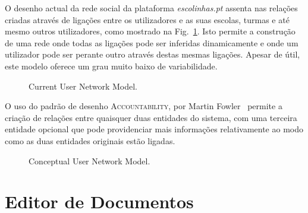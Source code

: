 \documentclass[9pt,a4paper]{extarticle}
\begin{document}
\begin{multicols}{2}
O desenho actual da rede social da plataforma \emph{escolinhas.pt} assenta nas relações criadas através de ligações entre os utilizadores e as suas escolas, turmas e até mesmo outros utilizadores, como mostrado na Fig.~\ref{fig:social_network_current}. Isto permite a construção de uma rede onde todas as ligações pode ser inferidas dinamicamente e onde um utilizador pode ser perante outro através destas mesmas ligações. Apesar de útil, este modelo oferece um grau muito baixo de variabilidade.

\begin{figure}[H]
  \caption{Current User Network Model.}
  \label{fig:social_network_current}
\end{figure}


O uso do padrão de desenho \textsc{Accountability}, por Martin Fowler~\cite{fowler_accountability} permite a criação de relações entre quaisquer duas entidades do sistema, com uma terceira entidade opcional que pode providenciar mais informações relativamente ao modo como as duas entidades originais estão ligadas.

\begin{figure}[H]
  \caption{Conceptual User Network Model.}
  \label{fig:social_network_conceptual}
\end{figure}

\section{Editor de Documentos}\label{sec:document_editor}


\end{multicols}
\end{document}

